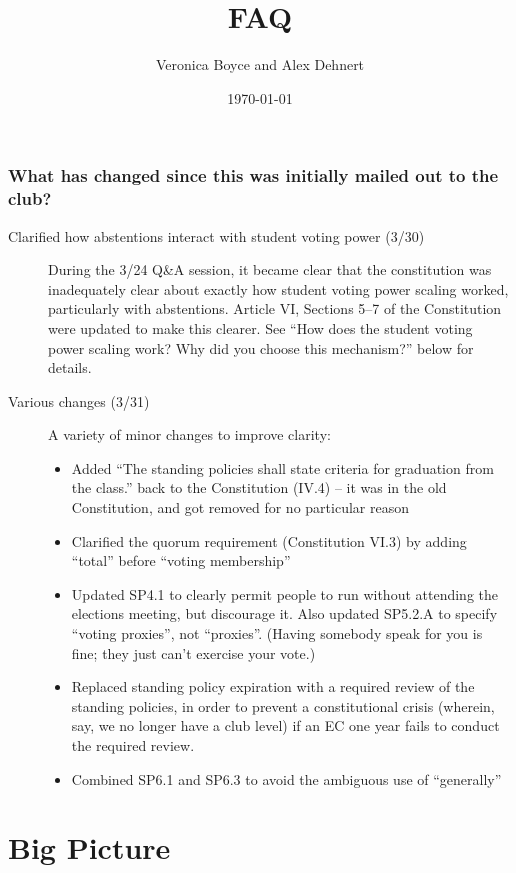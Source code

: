 \documentclass{article}
\title{FAQ}
\author{Veronica Boyce and Alex Dehnert}
\date{\today}
\begin{document}
\maketitle

\subsubsection*{What has changed since this was initially mailed out to the club?}
\begin{description}
\item[Clarified how abstentions interact with student voting power (3/30)] During the 3/24 Q\&A session, it became clear that the constitution was inadequately clear about exactly how student voting power scaling worked, particularly with abstentions. Article VI, Sections 5--7 of the Constitution were updated to make this clearer. See ``How does the student voting power scaling work? Why did you choose this mechanism?'' below for details.
\item[Various changes (3/31)] A variety of minor changes to improve clarity:
  \begin{itemize}
  \item Added ``The standing policies shall state criteria for graduation from the class.'' back to the Constitution (IV.4) -- it was in the old Constitution, and got removed for no particular reason
  \item Clarified the quorum requirement (Constitution VI.3) by adding ``total'' before ``voting membership''
  \item Updated SP4.1 to clearly permit people to run without attending the elections meeting, but discourage it. Also updated SP5.2.A to specify ``voting proxies'', not ``proxies''. (Having somebody speak for you is fine; they just can't exercise your vote.)
  \item Replaced standing policy expiration with a required review of the standing policies, in order to prevent a constitutional crisis (wherein, say, we no longer have a club level) if an EC one year fails to conduct the required review.
  \item Combined SP6.1 and SP6.3 to avoid the ambiguous use of ``generally''
  \end{itemize}

\end{description}

\section{Big Picture}
\end{document}
